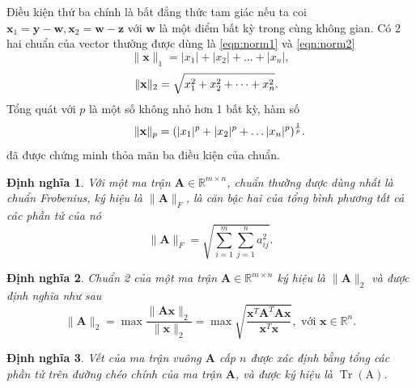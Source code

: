 \documentclass[12pt,a4paper,oneside]{report}
\newtheorem{dn}{Định nghĩa}[section]
\numberwithin{equation}{section}
\def\R{\mathbb{R}}
\begin{document}
{Điều kiện thứ ba} chính là bất đẳng thức tam giác nếu ta coi
$\mathbf{x}_1 = \mathbf{y - w}, \mathbf{x}_2 = \mathbf{w - z} $ với
$\mathbf{w}$ là một điểm bất kỳ trong cùng không gian.
Có 2 hai chuẩn của vector thường được dùng là \ref{eqn:norm1} và \ref{eqn:norm2}
\begin{equation}
	\label{eqn:norm1}
	\|\mathbf{x}\|_1 = |x_1| + |x_2| + \dots +|x_n| ,
\end{equation}
\begin{equation}
	\label{eqn:norm2}
	\hspace{-0.24cm} \|\mathbf{x}\|_2 = \sqrt{x_1^2 + x_2^2 + \dots + x_n^2} .
\end{equation}
Tổng quát với $p$ {là một số không nhỏ hơn 1} bất kỳ, hàm số
\begin{equation}
	\label{eqn:normp}
	\hspace{0.57cm}  \|\mathbf{x}\|_p = (|x_1|^p + |x_2|^p + \dots |x_n|^p)^{\frac{1}{p}}.
\end{equation}
đã được chứng minh thỏa mãn ba điều kiện của chuẩn.
\begin{dn}\cite{tiep2018}
	Với một ma trận $\mathbf{A} \in \mathbb{R}^{m\times n}$, chuẩn thường được dùng
	nhất là chuẩn Frobenius, ký hiệu là $\|\mathbf{A}\|_F$, là căn bậc hai của tổng
	bình phương tất cả các phần tử của nó
	\begin{equation*}
		\|\mathbf{A}\|_F = \sqrt{\sum_{i = 1}^m \sum_{j = 1}^n a_{ij}^2}.
	\end{equation*}
\end{dn}
\begin{dn}\cite{tiep2018}
Chuẩn 2 của một ma trận $\mathbf{A} \in \R^{m\times n}$ ký hiệu là $\|\mathbf{A}\|_2$ và được định nghĩa như sau
$$
\|\mathbf{A}\|_2=\max \frac{\|\mathbf{A} \mathbf{x}\|_2}{\|\mathbf{x}\|_2}=\max \sqrt{\frac{\mathbf{x}^T \mathbf{A}^T \mathbf{A} \mathbf{x}}{\mathbf{x}^T \mathbf{x}}}, \text { với } \mathbf{x} \in \mathbb{R}^n .
$$

\end{dn}	
\begin{dn}\cite{tri2014}
	Vết của ma trận vuông $\mathbf{A}$ cấp $n$ được xác định bằng tổng các phần tử trên đường chéo chính của ma trận $\mathbf{A}$, và được ký hiệu là $\operatorname{Tr}(\mathrm{A})$.
\end{dn}
\end{document}
